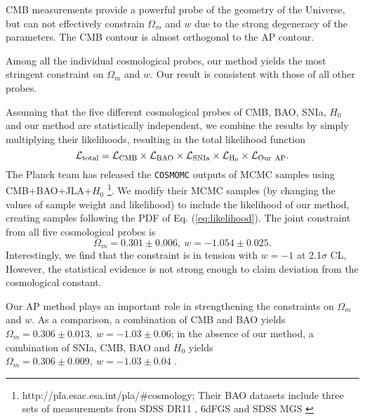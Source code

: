 \documentclass[iop]{emulateapj}
\begin{document}
CMB measurements provide a powerful probe of the geometry of the Universe,
but can not effectively constrain $\Omega_m$ and $w$ due to the strong degeneracy of the parameters.
The CMB contour is almost orthogonal to the AP contour. 

Among all the individual cosmological probes, our method yields the most stringent 
constraint on $\Omega_m$ and $w$.
Our result is consistent with those of all other probes.

Assuming that the five different cosmological probes of CMB, BAO, SNIa, $H_0$ and our method are 
statistically independent,
we combine the results by simply multiplying their likelihoods,
resulting in the total likelihood function
\begin{equation}\label{eq:likelihood}
\mathcal{L}_{\rm total} = \mathcal{L}_{\rm CMB} \times \mathcal{L}_{\rm BAO} \times \mathcal{L}_{\rm SNIa}\times \mathcal{L}_{\rm H_0}
 \times \mathcal{L}_{\rm Our\ AP}.
\end{equation}
The Planck team has released the {\texttt {COSMOMC}} outputs of MCMC samples
using CMB+BAO+JLA+$H_0$
\footnote{http://pla.esac.esa.int/pla/\#cosmology; 
Their BAO datasets include three sets of measurements from SDSS DR11 \citep{Anderson2013}, 6dFGS \citep{6dFGS} and SDSS MGS \citep{MGS}}.
We modify their MCMC samples (by changing the values of sample weight and likelihood)
 to include the likelihood of our method,
creating samples following the PDF of Eq. (\ref{eq:likelihood}).
The joint constraint from all five cosmological probes is
\begin{equation}
 \Omega_m = 0.301 \pm 0.006,\ w=-1.054 \pm 0.025. %
\end{equation}
Interestingly, we find that the constraint is in tension with $w=-1$ at 2.1$\sigma$ CL,
However, the statistical evidence is not strong enough to claim deviation from the cosmological constant.

Our AP method plays an important role in strengthening the constraints on $\Omega_m$ and $w$.
As a comparison, 
a combination of CMB and BAO yields 
$\Omega_m = 0.306 \pm 0.013,\ w=-1.03 \pm 0.06$;
in the absence of our method, a combination of SNIa, CMB, BAO and $H_0$
yields $\Omega_m = 0.306 \pm 0.009,\ w=-1.03 \pm 0.04$ \citep{Planck2015}.
\end{document}
